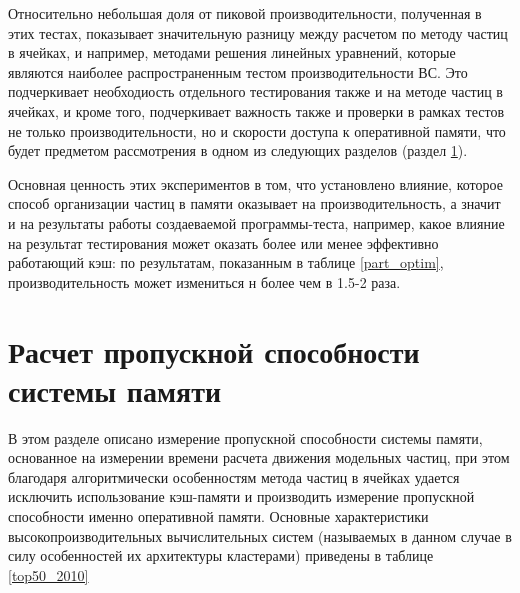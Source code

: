 Относительно небольшая доля от пиковой производительности, полученная в этих тестах, показывает значительную разницу между расчетом по методу частиц в ячейках, и например, методами решения линейных уравнений, которые являются наиболее распространенным тестом производительности ВС. Это подчеркивает необходиость отдельного тестирования также и на методе частиц в ячейках, и кроме того, подчеркивает важность также и проверки в рамках тестов не только производительности, но и скорости доступа к оперативной памяти, что будет предметом рассмотрения в одном из следующих разделов (раздел \ref{perfRAM}). 

Основная ценность этих экспериментов в том, что установлено влияние, которое способ организации частиц в памяти оказывает на производительность, а значит и на результаты работы создаеваемой программы-теста, например, какое влияние на результат тестирования может оказать более или менее эффективно работающий кэш: по результатам, показанным в таблице \ref{part_optim}, производительность может измениться н более чем в 1.5-2 раза.


\section{Расчет пропускной способности системы памяти}
\label{perfRAM}
В этом разделе описано измерение пропускной способности системы памяти, основанное на измерении времени расчета движения модельных частиц, при этом благодаря алгоритмически особенностям метода частиц в ячейках удается исключить использование кэш-памяти и производить измерение пропускной способности именно оперативной памяти. Основные характеристики высокопроизводительных вычислительных систем (называемых в данном случае в силу особенностей их архитектуры кластерами) приведены в таблице \ref{top50_2010}

